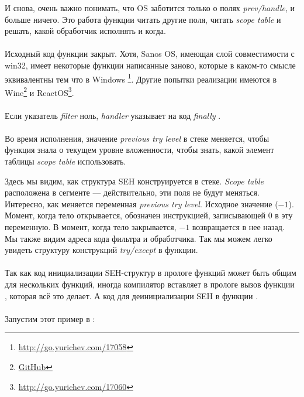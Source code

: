 

И снова, очень важно понимать, что OS заботится только о полях \emph{prev/handle}, и больше ничего.
Это работа функции  читать другие поля, читать \emph{scope table} и решать, какой обработчик исполнять и когда.\\
\\
Исходный код функции  закрыт.
Хотя, Sanos OS, имеющая слой совместимости с win32, имеет некоторые функции написанные заново, которые
в каком-то смысле эквивалентны тем что в Windows
\footnote{\url{http://go.yurichev.com/17058}}.
Другие попытки реализации имеются в 
Wine\footnote{\href{http://go.yurichev.com/17059}{GitHub}}
и ReactOS\footnote{\url{http://go.yurichev.com/17060}}.\\
\\
Если указатель \emph{filter} ноль, \emph{handler} указывает на код \emph{finally} .\\
\\
Во время исполнения, значение \emph{previous try level} в стеке меняется, чтобы функция
 знала о текущем уровне вложенности, чтобы знать, какой элемент таблицы
\emph{scope table} использовать.






Здесь мы видим, как структура SEH конструируется в стеке.
\emph{Scope table} расположена в сегменте  --- действительно, эти поля не будут меняться.
Интересно, как меняется переменная \emph{previous try level}.
Исходное значение  ($-1$).
Момент, когда тело  открывается, обозначен инструкцией, записывающей 0 в эту переменную.
В момент, когда тело  закрывается, $-1$ возвращается в нее назад.
Мы также видим адреса кода фильтра и обработчика.
Так мы можем легко увидеть структуру конструкций \emph{try/except} в функции.\\
\\
Так как код инициализации SEH-структур в прологе функций может быть общим для нескольких функций, иногда компилятор
вставляет в прологе вызов функции , которая всё это делает.
А код для деинициализации SEH в функции .\\
\\
Запустим этот пример в \tracer{}:

